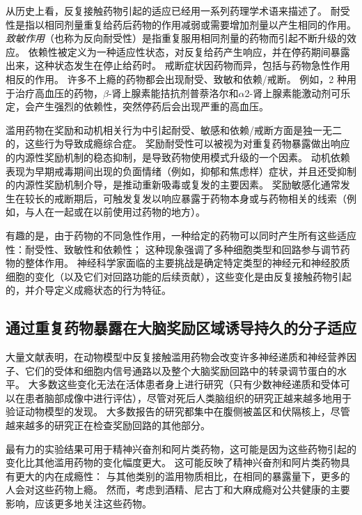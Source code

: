 从历史上看，反复接触药物引起的适应已经用一系列药理学术语来描述了。
耐受性是指以相同剂量重复给药后药物的作用减弱或需要增加剂量以产生相同的作用。
\textit{致敏作用}（也称为反向耐受性）是指重复服用相同剂量的药物而引起不断升级的效应。
依赖性被定义为一种适应性状态，对反复给药产生响应，并在停药期间暴露出来，这种状态发生在停止给药时。
戒断症状因药物而异，包括与药物急性作用相反的作用。
许多不上瘾的药物都会出现耐受、致敏和依赖/戒断。
例如，2 种用于治疗高血压的药物，$ \beta $-肾上腺素能拮抗剂普萘洛尔和$ \alpha $2-肾上腺素能激动剂可乐定，会产生强烈的依赖性，突然停药后会出现严重的高血压。


滥用药物在奖励和动机相关行为中引起耐受、敏感和依赖/戒断方面是独一无二的，这些行为导致成瘾综合症。
奖励耐受性可以被视为对重复药物暴露做出响应的内源性奖励机制的稳态抑制，是导致药物使用模式升级的一个因素。
动机依赖表现为早期戒毒期间出现的负面情绪（例如，抑郁和焦虑样）症状，并且还受抑制的内源性奖励机制介导，是推动重新吸毒或复发的主要因素。
奖励敏感化通常发生在较长的戒断期后，可触发复发以响应暴露于药物本身或与药物相关的线索（例如，与人在一起或在以前使用过药物的地方）。


有趣的是，由于药物的不同急性作用，一种给定的药物可以同时产生所有这些适应性：耐受性、致敏性和依赖性；
这种现象强调了多种细胞类型和回路参与调节药物的整体作用。
神经科学家面临的主要挑战是确定特定类型的神经元和神经胶质细胞的变化（以及它们对回路功能的后续贡献），这些变化是由反复接触药物引起的，并介导定义成瘾状态的行为特征。



\subsection{通过重复药物暴露在大脑奖励区域诱导持久的分子适应}

大量文献表明，在动物模型中反复接触滥用药物会改变许多神经递质和神经营养因子、它们的受体和细胞内信号通路以及整个大脑奖励回路中的转录调节蛋白的水平。
大多数这些变化无法在活体患者身上进行研究（只有少数神经递质和受体可以在患者脑部成像中进行评估），尽管对死后人类脑组织的研究正越来越多地用于验证动物模型的发现。
大多数报告的研究都集中在腹侧被盖区和伏隔核上，尽管越来越多的研究正在检查奖励回路的其他部分。


最有力的实验结果可用于精神兴奋剂和阿片类药物，这可能是因为这些药物引起的变化比其他滥用药物的变化幅度更大。
这可能反映了精神兴奋剂和阿片类药物具有更大的内在成瘾性：
与其他类别的滥用物质相比，在相同的暴露量下，更多的人会对这些药物上瘾。
然而，考虑到酒精、尼古丁和大麻成瘾对公共健康的主要影响，应该更多地关注这些药物。


